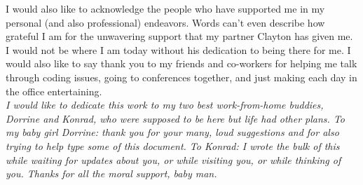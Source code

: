 I would also like to acknowledge the people who have supported me in my personal (and also professional) endeavors. Words can't even describe how grateful I am for the unwavering support that my partner Clayton has given me. I would not be where I am today without his dedication to being there for me. I would also like to say thank you to my friends and co-workers for helping me talk through coding issues, going to conferences together, and just making each day in the office entertaining. \\


\noindent \textit{I would like to dedicate this work to my two best work-from-home buddies, Dorrine and Konrad, who were supposed to be here but life had other plans. To my baby girl Dorrine: thank you for your many, loud suggestions and for also trying to help type some of this document. To Konrad: I wrote the bulk of this while waiting for updates about you, or while visiting you, or while thinking of you. Thanks for all the moral support, baby man.}